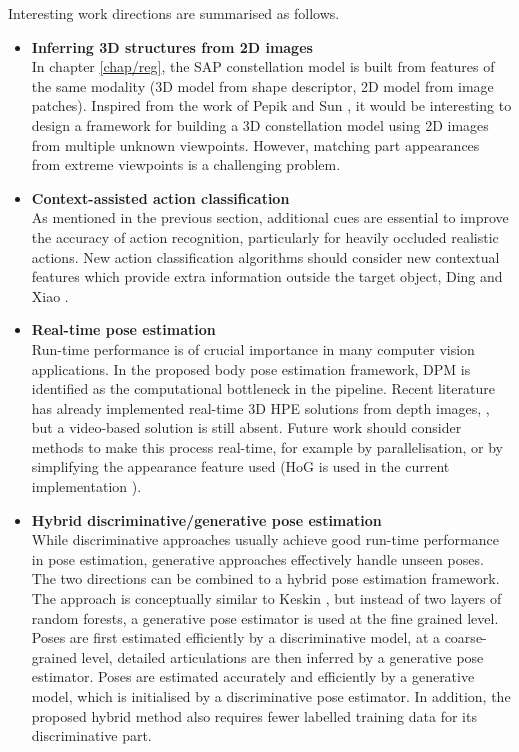 \iffalse
Interesting work directions are summarised as follows.
\begin{itemize}
	\item \textbf{Inferring 3D structures from 2D images} \\  
	In chapter \ref{chap/reg}, the SAP constellation model is built from features of the same modality (3D model from shape descriptor, 2D model from image patches). Inspired from the work of Pepik \etal \cite{Pepik2012} and Sun \etal \cite{Sun2009}, it would be interesting to design a framework for building a 3D constellation model using 2D images from multiple unknown viewpoints. However, matching part appearances from extreme viewpoints is a challenging problem.  
	\item \textbf{Context-assisted action classification} \\ 
	As mentioned in the previous section, additional cues are essential to improve the accuracy of action recognition, particularly for heavily occluded realistic actions. New action classification algorithms should consider new contextual features which provide extra information outside the target object, \eg Ding and Xiao \cite{Ding2012}.   
	\item \textbf{Real-time pose estimation}\\ 
	Run-time performance is of crucial importance in many computer vision applications. In the proposed body pose estimation framework, DPM is identified as the computational bottleneck in the pipeline. 
	Recent literature has already implemented real-time 3D HPE solutions from depth images, \eg \cite{Baak2011, Girshick2011, Sun2012}, but a video-based solution is still absent.  
	Future work should consider methods to make this process real-time, for example by parallelisation, or by simplifying the appearance feature used (HoG is used in the current implementation \cite{Yang2011}).  
	\item \textbf{Hybrid discriminative/generative pose estimation}\\
	While discriminative approaches usually achieve good run-time performance in pose estimation, generative approaches effectively handle unseen poses. The two directions can be combined to a hybrid pose estimation framework. The approach is conceptually similar to Keskin \etal \cite{Keskin2012}, but instead of two layers of random forests, a generative pose estimator is used at the fine grained level. Poses are first estimated efficiently by a discriminative model, at a coarse-grained level, detailed articulations are then inferred by a generative pose estimator. Poses are estimated accurately and efficiently by a generative model, which is initialised by a discriminative pose estimator. In addition, the proposed hybrid method also requires fewer labelled training data for its discriminative part. 

\end{itemize}
